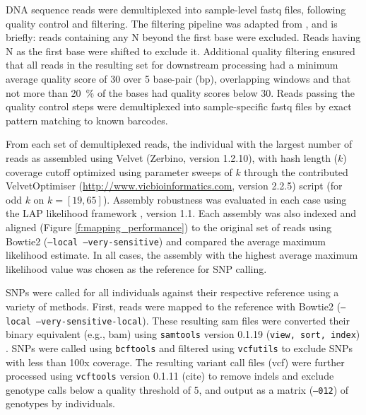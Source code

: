 \documentclass[11pt]{article}
\begin{document}
DNA sequence reads were demultiplexed into sample-level fastq files, following quality control 
and filtering.  The filtering pipeline was adapted from \citep{Friedline:2012fm}, and is briefly: reads 
containing any N beyond the first base were excluded. Reads having N as the first base were shifted 
to exclude it.  Additional quality filtering ensured that all reads in the resulting set for downstream 
processing had a minimum average quality score of 30 over 5 base-pair (bp), overlapping windows 
and that not more than \SI{20}{\percent} of the bases had quality scores below 30. Reads passing the 
quality control steps were demultiplexed into sample-specific fastq files by exact pattern matching to 
known barcodes.

From each set of demultiplexed reads, the individual with the largest number of reads as assembled using 
Velvet (Zerbino, version 1.2.10), with hash length ($k$) coverage cutoff optimized using parameter sweeps of $k$ 
through the contributed VelvetOptimiser (\url{http://www.vicbioinformatics.com}, version 2.2.5) 
script (for odd $k$ on $k=[19,65]$).  Assembly robustness was evaluated in each case using the LAP likelihood 
framework \citep{Ghodsi:2013bc}, version 1.1.  Each assembly was also indexed and aligned 
(Figure \ref{f:mapping_performance}) to the original set of reads 
using Bowtie2 \citep{Langmead:2012jh} (\texttt{--local --very-sensitive}) and compared the average maximum 
likelihood estimate. In all cases, the assembly with the highest average maximum likelihood value was 
chosen as the reference for SNP calling.

SNPs were called for all individuals against their respective reference using a variety of methods.  First, 
reads were mapped to the reference with Bowtie2 (\texttt{--local --very-sensitive-local}).  These resulting 
sam files were converted their binary equivalent (e.g., bam) using \texttt{samtools} version 0.1.19 
(\texttt{view, sort, index}) \citep{Li:2009ka}.  SNPs were called using \texttt{bcftools} and filtered using 
\texttt{vcfutils} to exclude SNPs with less than 100x coverage. The resulting variant call files (vcf) 
were further processed using \texttt{vcftools} version 0.1.11 (cite) to remove indels and exclude genotype 
calls below a quality threshold of 5, and output as a matrix (\texttt{--012}) of genotypes by individuals.  
\end{document}
